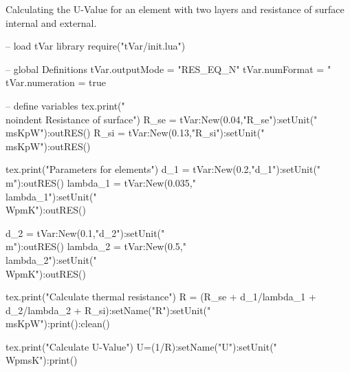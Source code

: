 \documentclass{article}
\newcommand{\msKpW}{\tfrac{m^2K}{W}}
\newcommand{\WpmsK}{\tfrac{W}{m^2K}}
\newcommand{\WpmK}{\tfrac{W}{mK}}
\newcommand{\m}{m}
\begin{document}
Calculating the U-Value for an element with two layers and resistance of surface internal and external.\\

\begin{luacode}
	-- load tVar library
	require("tVar/init.lua")

	-- global Definitions
	tVar.outputMode = "RES_EQ_N"
	tVar.numFormat = "%
	tVar.numeration = true
		
	-- define variables
	tex.print("\\noindent Resistance of surface")
	R_se = tVar:New(0.04,"R_{se}"):setUnit("\\msKpW"):outRES()
	R_si = tVar:New(0.13,"R_{si}"):setUnit("\\msKpW"):outRES()
	
	tex.print("Parameters for elements")
	d_1 = tVar:New(0.2,"d_1"):setUnit("\\m"):outRES()
	lambda_1 = tVar:New(0.035,"\\lambda_1"):setUnit("\\WpmK"):outRES()
	
	d_2 = tVar:New(0.1,"d_2"):setUnit("\\m"):outRES()
	lambda_2 = tVar:New(0.5,"\\lambda_2"):setUnit("\\WpmK"):outRES()
	
	tex.print("Calculate thermal resistance")
	R = (R_se + d_1/lambda_1 + d_2/lambda_2 + R_si):setName("R"):setUnit("\\msKpW"):print():clean()
	
	tex.print("Calculate U-Value")
	U=(1/R):setName("U"):setUnit("\\WpmsK"):print()
\end{luacode}
\end{document}
